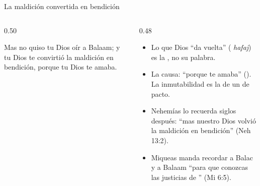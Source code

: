 \begin{frame}{La maldición convertida en bendición}
\begin{columns}[t,onlytextwidth]
\begin{column}{0.50\textwidth}
\begin{cita}Mas no quiso \SENOR{} tu Dios oír a Balaam; y \SENOR{} tu Dios te convirtió la maldición en bendición, porque \SENOR{} tu Dios te amaba.\end{cita}
\begin{center}\end{center}
\end{column}
\begin{column}{0.48\textwidth}\small
\begin{itemize}
\item Lo que Dios ``da vuelta'' ( \emph{hafaj}) es la , no su palabra.
\item La causa: ``porque te amaba'' (). La inmutabilidad es la de un  de pacto.
\item Nehemías lo recuerda siglos después: ``mas nuestro Dios volvió la maldición en bendición'' (Neh 13:2).
\item Miqueas manda recordar a Balac y a Balaam ``para que conozcas las justicias de \SENOR'' (Mi 6:5).
\end{itemize}
\end{column}
\end{columns}
\end{frame}

